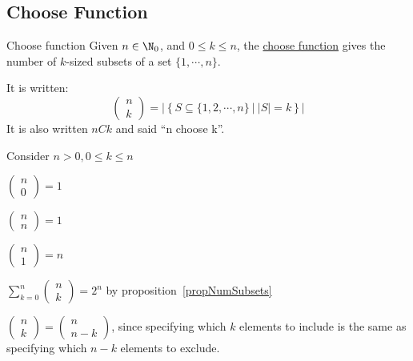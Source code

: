 \documentclass[../Main.tex]{subfiles}
\begin{document}
\subsection{Choose Function}
\begin{definition}{Choose function}
    Given $n \in \N_0$, and $0 \leq k \leq n$, the \underline{choose function} gives the number of $k$-sized subsets of a set $\{1, \cdots, n\}$.\par
    It is written:
    \begin{equation*}
        \begin{pmatrix}n \\ k\end{pmatrix} = \left|\left\{S \subseteq \{1, 2, \cdots, n\}~|~|S|=k\right\}\right|
    \end{equation*}
    It is also written $nCk$ and said ``n choose k''.
\end{definition}
\begin{examples}{
        Consider $n > 0, 0 \leq k \leq n$
    }
    \item $\begin{pmatrix}n \\ 0\end{pmatrix} = 1$
    \item $\begin{pmatrix}n \\ n\end{pmatrix} = 1$
    \item $\begin{pmatrix}n \\ 1\end{pmatrix} = n$
    \item $\sum_{k=0}^n \begin{pmatrix}n \\ k\end{pmatrix} = 2^n$ by proposition~\ref{propNumSubsets}
    \item $\begin{pmatrix}n \\ k\end{pmatrix} = \begin{pmatrix}n \\ n - k\end{pmatrix}$, since specifying which $k$ elements to include is the same as specifying which $n - k$ elements to exclude.
\end{examples}
\end{document}
